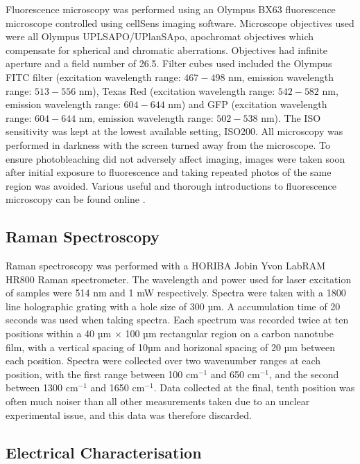 \documentclass[
  a4paper,
]{scrbook}
\begin{document}
Fluorescence microscopy was performed using an Olympus BX63 fluorescence
microscope controlled using cellSens imaging software. Microscope
objectives used were all Olympus UPLSAPO/UPlanSApo, apochromat
objectives which compensate for spherical and chromatic aberrations.
Objectives had infinite aperture and a field number of 26.5. Filter
cubes used included the Olympus FITC filter (excitation wavelength
range: \(467-498\) nm, emission wavelength range: \(513-556\) nm), Texas
Red (excitation wavelength range: \(542-582\) nm, emission wavelength
range: \(604-644\) nm) and GFP (excitation wavelength range: \(604-644\)
nm, emission wavelength range: \(502-538\) nm). The ISO sensitivity was
kept at the lowest available setting, ISO200. All microscopy was
performed in darkness with the screen turned away from the microscope.
To ensure photobleaching did not adversely affect imaging, images were
taken soon after initial exposure to fluorescence and taking repeated
photos of the same region was avoided. Various useful and thorough
introductions to fluorescence microscopy can be found online
\autocite{Nikon,Zeiss}.

\hypertarget{sec-raman-characterisation}{%
\subsection{Raman Spectroscopy}\label{sec-raman-characterisation}}

Raman spectroscopy was performed with a HORIBA Jobin Yvon LabRAM HR800
Raman spectrometer. The wavelength and power used for laser excitation
of samples were 514 nm and 1 mW respectively. Spectra were taken with a
1800 line holographic grating with a hole size of 300 µm. A accumulation
time of 20 seconds was used when taking spectra. Each spectrum was
recorded twice at ten positions within a 40 µm \(\times\) 100 µm
rectangular region on a carbon nanotube film, with a vertical spacing of
10µm and horizonal spacing of 20 µm between each position. Spectra were
collected over two wavenumber ranges at each position, with the first
range between 100 cm\(^{-1}\) and 650 cm\(^{-1}\), and the second
between 1300 cm\(^{-1}\) and 1650 cm\(^{-1}\). Data collected at the
final, tenth position was often much noiser than all other measurements
taken due to an unclear experimental issue, and this data was therefore
discarded.

\hypertarget{sec-electrical-characterisation}{%
\subsection{Electrical
Characterisation}\label{sec-electrical-characterisation}}
\end{document}
